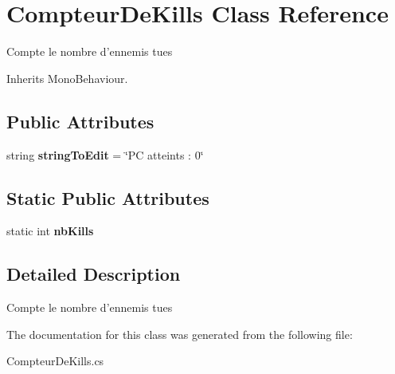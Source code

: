 \hypertarget{class_compteur_de_kills}{\section{Compteur\+De\+Kills Class Reference}
\label{class_compteur_de_kills}
}


Compte le nombre d'ennemis tues  




Inherits Mono\+Behaviour.

\subsection*{Public Attributes}
\begin{DoxyCompactItemize}
\item 
\hypertarget{class_compteur_de_kills_af83af9e8d23812c74ba23274bd596ddb}{string {\bfseries string\+To\+Edit} = \char`\"{}P\+C atteints \+: 0\char`\"{}}\label{class_compteur_de_kills_af83af9e8d23812c74ba23274bd596ddb}

\end{DoxyCompactItemize}
\subsection*{Static Public Attributes}
\begin{DoxyCompactItemize}
\item 
\hypertarget{class_compteur_de_kills_a168555835e133804e506d6e6f670e42f}{static int {\bfseries nb\+Kills}}\label{class_compteur_de_kills_a168555835e133804e506d6e6f670e42f}

\end{DoxyCompactItemize}


\subsection{Detailed Description}
Compte le nombre d'ennemis tues 



The documentation for this class was generated from the following file\+:\begin{DoxyCompactItemize}
\item 
Compteur\+De\+Kills.\+cs\end{DoxyCompactItemize}
